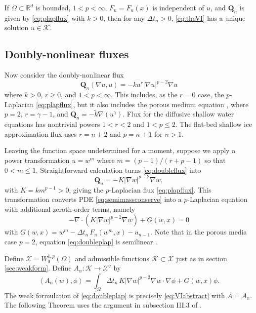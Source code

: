 \documentclass[final,leqno,onefignum,onetabnum]{siamltex1213bueler}
\newcommand\bQ{\mathbf{Q}}
\newcommand{\Div}{\nabla\cdot}
\renewcommand{\grad}{\nabla}
\newcommand{\ip}[2]{\ensuremath{\left<#1,#2\right>}}
\newcommand\RR{\mathbb{R}}
\begin{document}
\begin{theorem}  \label{thm:plapwellposed}  If $\Omega\subset \RR^d$ is bounded, $1<p<\infty$, $F_n=F_n(x)$ is independent of $u$, and $\bQ_n$ is given by \eqref{eq:plapflux} with $k>0$, then for any $\Delta t_n>0$, \eqref{eq:theVI} has a unique solution $u\in\mathcal{K}$.
\end{theorem}

\subsection{Doubly-nonlinear fluxes} \label{subsec:powertransform}  Now consider the doubly-nonlinear flux
\begin{equation}
  \bQ_n(\grad u,u) = - k u^r |\grad u|^{p-2} \grad u \label{eq:doubleflux}
\end{equation}
where $k>0$, $r\ge 0$, and $1<p<\infty$.  This includes, as the $r=0$ case, the $p$-Laplacian \eqref{eq:plapflux}, but it also includes the porous medium equation \cite{Vazquez2007}, where $p=2$, $r=\gamma-1$, and $\bQ_n = - \tilde k \grad(u^\gamma)$.  Flux for the diffusive shallow water equations \cite{AlonsoSantillanaDawson2008} has nontrivial powers $1<r<2$ and $1<p\le 2$.  The flat-bed shallow ice approximation \cite{Calvoetal2002} flux uses $r=n+2$ and $p=n+1$ for $n>1$.

Leaving the function space undetermined for a moment, suppose we apply a power transformation $u = w^m$ where $m = (p-1)/(r+p-1)$ \cite{Raviart1970} so that $0 < m \le 1$.  Straightforward calculation turns \eqref{eq:doubleflux} into
\begin{equation}
	\bQ_n = - K |\grad w|^{p-2} \grad w, \label{eq:doublenewflux}
\end{equation}
with $K=k m^{p-1}>0$, giving the $p$-Laplacian flux \eqref{eq:plapflux}.  This transformation converts PDE \eqref{eq:semimassconserve} into a $p$-Laplacian equation with additional zeroth-order terms, namely
\begin{equation}
    - \Div\left(K|\grad w|^{p-2} \grad w\right) + G(w,x) = 0  \label{eq:doubleplap}
\end{equation}
with $G(w,x) = w^m - \Delta t_n\, F_n(w^m,x) - u_{n-1}$.  Note that in the porous media case $p=2$, equation \eqref{eq:doubleplap} is semilinear \cite{Evans2010}.

Define $\mathcal{X} = W_0^{1,p}(\Omega)$ and admissible functions $\mathcal{K}\subset \mathcal{X}$ just as in section \ref{sec:weakform}.  Define $A_n: \mathcal{K} \to \mathcal{X}'$ by
\begin{equation}
\ip{A_n(w)}{\phi} = \int_\Omega \Delta t_n\, K |\grad w|^{p-2} \grad w\cdot \grad \phi + G(w,x)\phi. \label{eq:doubleform}
\end{equation}
The weak formulation of \eqref{eq:doubleplap} is precisely \eqref{eq:VIabstract} with $A=A_n$.  The following Theorem uses the argument in subsection III.3 of \cite{KinderlehrerStampacchia1980}.
\end{document}
